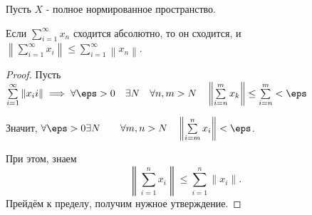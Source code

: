 \begin{theorem} \thmslashn

    Пусть $X$ - полное нормированное пространство.

    Если $\sum\limits_{i=1}^{\infty} x_{n}$ сходится абсолютно, то он сходится, и $\left\|\sum\limits_{i=1}^{\infty} x_{i}\right\| \le \sum\limits_{i=1}^{\infty} \left\|x_{n}\right\|$.
    \begin{proof} \thmslashn
    
        Пусть $\sum\limits_{i=1}^{\infty} \|x_{i}i\| \implies \forall{\eps > 0}\quad \exists{N}\quad \forall{n,m > N}\quad \left\|\sum\limits_{i=n}^{m} x_{k}\right\| \le \sum\limits_{i=n}^{m} < \eps$

        Значит, $\forall{\eps > 0}\exists{N}\quad \quad \forall{m,n > N}\quad \left\|\sum\limits_{i=m}^{n} x_{i}\right\| < \eps$.


        При этом, знаем
        \[ \left\|\sum\limits_{i=1}^{n}x_{i}\right\| \le \sum\limits_{i=1}^{n} \|x_{i}\| .\]
        Прейдём к пределу, получим нужное утверждение.
    \end{proof}
\end{theorem}
